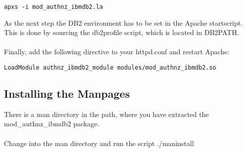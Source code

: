 \documentclass[11pt,letterpaper]{scrartcl}
\def\tt{\normalfont\ttfamily}
\begin{document}
\begin{verbatim}
apxs -i mod_authnz_ibmdb2.la
\end{verbatim}
As the next step the DB2 environment has to be set in the Apache startscript. This is done by sourcing the {\tt db2profile} script, which is located in {\tt DB2PATH}.\\
\\
Finally, add the following directive to your httpd.conf and restart Apache:

\begin{verbatim}
LoadModule authnz_ibmdb2_module modules/mod_authnz_ibmdb2.so
\end{verbatim}

\subsection{Installing the Manpages}
There is a {\tt man} directory in the path, where you have extracted the mod\_authnz\_ibmdb2 package.\\
\\
Change into the man directory and run the script {\tt ./maninstall}
\newpage
\end{document}
